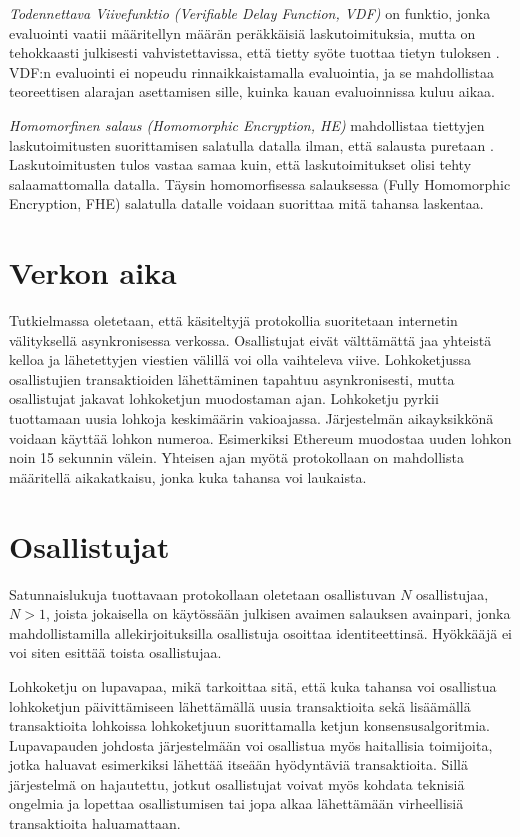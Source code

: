 \textit{Todennettava Viivefunktio (Verifiable Delay Function, VDF)} on funktio, jonka evaluointi vaatii määritellyn määrän peräkkäisiä laskutoimituksia, mutta on tehokkaasti julkisesti vahvistettavissa, että tietty syöte tuottaa tietyn tuloksen \cite{boneh_verifiable_2018}. VDF:n evaluointi ei nopeudu rinnaikkaistamalla evaluointia, ja se mahdollistaa teoreettisen alarajan asettamisen sille, kuinka kauan evaluoinnissa kuluu aikaa.

\textit{Homomorfinen salaus (Homomorphic Encryption, HE)} mahdollistaa tiettyjen laskutoimitusten suorittamisen salatulla datalla ilman, että salausta puretaan \cite{alma9928100443506253}. Laskutoimitusten tulos vastaa samaa kuin, että laskutoimitukset olisi tehty salaamattomalla datalla. Täysin homomorfisessa salauksessa (Fully Homomorphic Encryption, FHE) salatulla datalle voidaan suorittaa mitä tahansa laskentaa.


\section{Verkon aika}
Tutkielmassa oletetaan, että käsiteltyjä protokollia suoritetaan internetin välityksellä asynkronisessa verkossa. Osallistujat eivät välttämättä jaa yhteistä kelloa ja lähetettyjen viestien välillä voi olla vaihteleva viive. Lohkoketjussa osallistujien transaktioiden lähettäminen tapahtuu asynkronisesti, mutta osallistujat jakavat lohkoketjun muodostaman ajan. Lohkoketju pyrkii tuottamaan uusia lohkoja keskimäärin vakioajassa. Järjestelmän aikayksikkönä voidaan käyttää lohkon numeroa. Esimerkiksi Ethereum muodostaa uuden lohkon noin 15 sekunnin välein. Yhteisen ajan myötä protokollaan on mahdollista määritellä aikakatkaisu, jonka kuka tahansa voi laukaista.

\section{Osallistujat}

Satunnaislukuja tuottavaan protokollaan oletetaan osallistuvan $N$ osallistujaa, $N > 1$, joista jokaisella on käytössään julkisen avaimen salauksen avainpari, jonka mahdollistamilla allekirjoituksilla osallistuja osoittaa identiteettinsä. Hyökkääjä ei voi siten esittää toista osallistujaa. 

Lohkoketju on lupavapaa, mikä tarkoittaa sitä, että kuka tahansa voi osallistua lohkoketjun päivittämiseen lähettämällä uusia transaktioita sekä lisäämällä transaktioita lohkoissa lohkoketjuun suorittamalla ketjun konsensusalgoritmia. Lupavapauden johdosta järjestelmään voi osallistua myös haitallisia toimijoita, jotka haluavat esimerkiksi lähettää itseään hyödyntäviä transaktioita. Sillä järjestelmä on hajautettu, jotkut osallistujat voivat myös kohdata teknisiä ongelmia ja lopettaa osallistumisen tai jopa alkaa lähettämään virheellisiä transaktioita haluamattaan.

